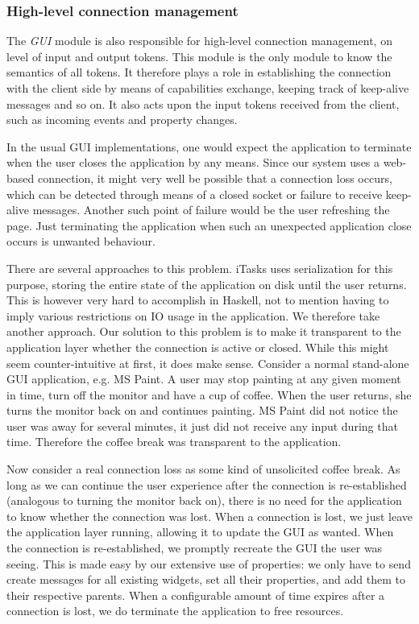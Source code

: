 \documentclass[11pt,a4paper]{article}
\begin{document}
\subsubsection{High-level connection management}
The \textit{GUI} module is also responsible for high-level connection management, on level of input and output tokens.
This module is the only module to know the semantics of all tokens.
It therefore plays a role in establishing the connection with the client side by means of capabilities exchange, keeping track of keep-alive messages and so on.
It also acts upon the input tokens received from the client, such as incoming events and property changes.

In the usual GUI implementations, one would expect the application to terminate when the user closes the application by any means.
Since our system uses a web-based connection, it might very well be possible that a connection loss occurs, which can be detected through means of a closed socket or failure to receive keep-alive messages.
Another such point of failure would be the user refreshing the page.
Just terminating the application when such an unexpected application close occurs is unwanted behaviour.

There are several approaches to this problem.
iTasks uses serialization for this purpose, storing the entire state of the application on disk until the user returns.
This is however very hard to accomplish in Haskell, not to mention having to imply various restrictions on IO usage in the application.
We therefore take another approach.
Our solution to this problem is to make it transparent to the application layer whether the connection is active or closed.
While this might seem counter-intuitive at first, it does make sense.
Consider a normal stand-alone GUI application, e.g. MS Paint.
A user may stop painting at any given moment in time, turn off the monitor and have a cup of coffee.
When the user returns, she turns the monitor back on and continues painting.
MS Paint did not notice the user was away for several minutes, it just did not receive any input during that time.
Therefore the coffee break was transparent to the application.

Now consider a real connection loss as some kind of unsolicited coffee break.
As long as we can continue the user experience after the connection is re-established (analogous to turning the monitor back on), there is no need for the application to know whether the connection was lost.
When a connection is lost, we just leave the application layer running, allowing it to update the GUI as wanted.
When the connection is re-established, we promptly recreate the GUI the user was seeing.
This is made easy by our extensive use of properties: we only have to send create messages for all existing widgets, set all their properties, and add them to their respective parents.
When a configurable amount of time expires after a connection is lost, we do terminate the application to free resources.
\end{document}
